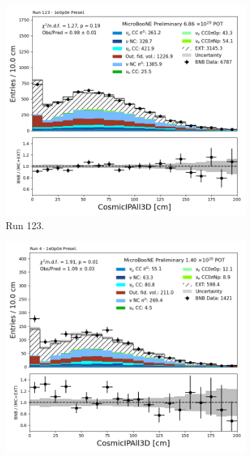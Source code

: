 \begin{figure}[H]
    \centering
    \begin{subfigure}[t]{0.32\linewidth}
        \includegraphics[width=\linewidth]{technote/Appendix_Preselection/Figures/1e0p0pi/Run123/CosmicIPAll3D_Run123_1e0p0pi_Presel.png}
        \caption{Run 123.}
    \end{subfigure}%
    \hspace{0.2cm}%
    \begin{subfigure}[t]{0.32\linewidth}
        \includegraphics[width=\linewidth]{technote/Appendix_Preselection/Figures/1e0p0pi/Run4b/CosmicIPAll3D_Run4b_1e0p0pi_Presel.png}

\end{subfigure}
\end{figure}

